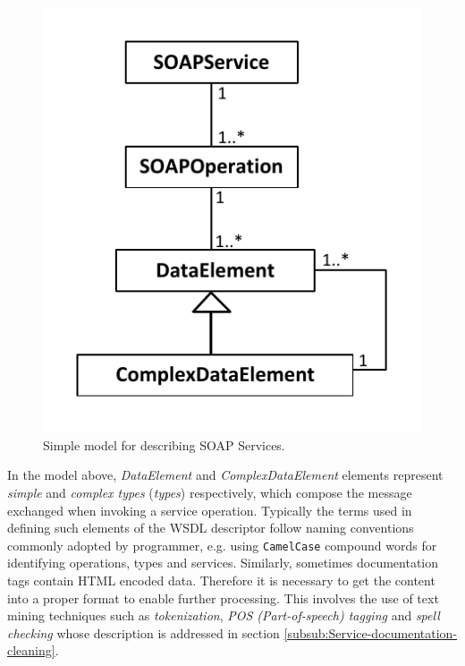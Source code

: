 \begin{figure}
\center\includegraphics[scale=0.6]{images/wsdl-simplified}

\caption{Simple model for describing SOAP Services.}
\label{wsdl-Simplified}

\end{figure}

In the model above, \emph{DataElement} and \emph{ComplexDataElement} elements represent \emph{simple }and\emph{ complex types} (\emph{types})
respectively, which compose the message exchanged when invoking a service operation. Typically the terms used in defining such elements of the WSDL descriptor follow naming conventions commonly adopted by programmer, e.g. using \texttt{CamelCase} compound words for identifying operations, types and services. Similarly, sometimes documentation tags contain HTML encoded data. Therefore it is necessary to get the content into a proper format to enable further processing. This involves the use of text mining techniques such as \emph{tokenization}, \emph{POS (Part-of-speech) tagging } and \emph{spell checking} whose description is addressed in section \ref{subsub:Service-documentation-cleaning}.

